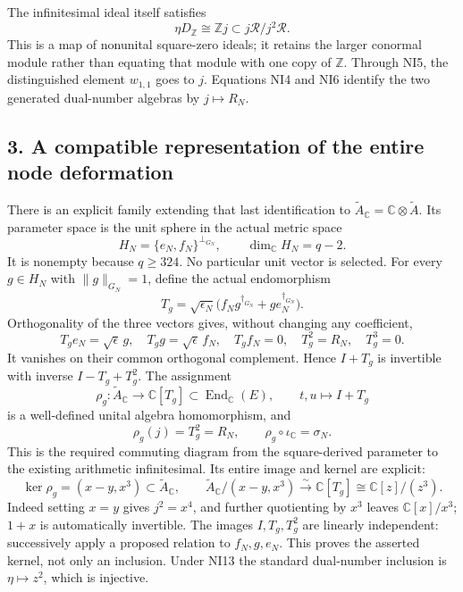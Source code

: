 \documentclass[
]{article}
\newcounter{none} %
\begin{document}
The infinitesimal ideal itself satisfies \[
\eta D_{\mathbb Z}\cong\mathbb Zj\subset j\mathcal R/j^2\mathcal R.
\tag{NI7}
\] This is a map of nonunital square-zero ideals; it retains the larger
conormal module rather than equating that module with one copy of
\(\mathbb Z\). Through NI5, the distinguished element \(w_{1,1}\) goes
to \(j\). Equations NI4 and NI6 identify the two generated dual-number
algebras by \(j\mapsto R_N\).

\subsection{3. A compatible representation of the entire node
deformation}\label{a-compatible-representation-of-the-entire-node-deformation}

There is an explicit family extending that last identification to
\(\widetilde A_{\mathbb C}=\mathbb C\otimes\widetilde A\). Its parameter
space is the unit sphere in the actual metric space \[
H_N=\{e_N,f_N\}^{\perp_{G_N}},\qquad \dim_{\mathbb C}H_N=q-2.
\tag{NI8}
\] It is nonempty because \(q\ge324\). No particular unit vector is
selected. For every \(g\in H_N\) with \(\|g\|_{G_N}=1\), define the
actual endomorphism \[
T_g=\sqrt{\epsilon_N}\bigl(f_Ng^{\dagger_{G_N}}+g e_N^{\dagger_{G_N}}\bigr).
\tag{NI9}
\] Orthogonality of the three vectors gives, without changing any
coefficient, \[
T_ge_N=\sqrt\epsilon\,g,\quad T_gg=\sqrt\epsilon\,f_N,\quad T_gf_N=0,
\quad T_g^2=R_N,\quad T_g^3=0.
\tag{NI10}
\] It vanishes on their common orthogonal complement. Hence \(I+T_g\) is
invertible with inverse \(I-T_g+T_g^2\). The assignment \[
\rho_g:\widetilde A_{\mathbb C}\longrightarrow\mathbb C[T_g]
\subset\operatorname{End}_{\mathbb C}(E),
\qquad t,u\longmapsto I+T_g
\tag{NI11}
\] is a well-defined unital algebra homomorphism, and \[
\rho_g(j)=T_g^2=R_N,\qquad
\rho_g\circ\iota_{\mathbb C}=\sigma_N.
\tag{NI12}
\] This is the required commuting diagram from the square-derived
parameter to the existing arithmetic infinitesimal. Its entire image and
kernel are explicit: \[
\ker\rho_g=(x-y,x^3)\subset\widetilde A_{\mathbb C},
\qquad
\widetilde A_{\mathbb C}/(x-y,x^3)
\xrightarrow{\sim}\mathbb C[T_g]\cong\mathbb C[z]/(z^3).
\tag{NI13}
\] Indeed setting \(x=y\) gives \(j^2=x^4\), and further quotienting by
\(x^3\) leaves \(\mathbb C[x]/x^3\); \(1+x\) is automatically
invertible. The images \(I,T_g,T_g^2\) are linearly independent:
successively apply a proposed relation to \(f_N,g,e_N\). This proves the
asserted kernel, not only an inclusion. Under NI13 the standard
dual-number inclusion is \(\eta\mapsto z^2\), which is injective.
\end{document}
